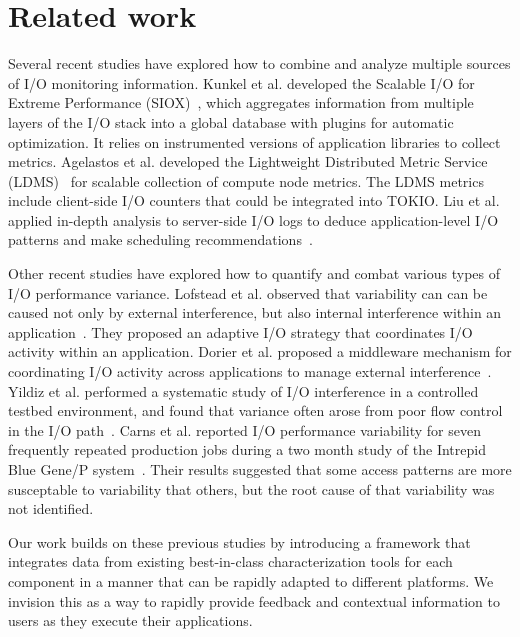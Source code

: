 \section{Related work} \label{sec:related}

Several recent studies have explored how to combine
and analyze multiple sources of I/O monitoring information.
Kunkel et al. developed the Scalable I/O for Extreme Performance
(SIOX)~\cite{Kunkel:2014:SAC:2769884.2769901}, which aggregates
information from multiple layers of the I/O stack into a global database
with plugins for automatic optimization.  It relies on instrumented
versions of application libraries to collect metrics.  Agelastos et al.
developed the Lightweight Distributed Metric Service (LDMS)~\cite{7013000}
for scalable collection of compute node metrics. The LDMS metrics include
client-side I/O counters that could be integrated into TOKIO.  Liu et al. applied in-depth
analysis to server-side I/O logs to deduce application-level I/O patterns
and make scheduling recommendations~\cite{Liu2016}.

Other recent studies have explored how to quantify and combat various
types of I/O performance variance.  Lofstead et al. observed that
variability can can be caused not only by external interference, but also
internal interference within an application~\cite{lofstead2010managing}.
They proposed an adaptive I/O strategy that coordinates I/O activity
within an application.  Dorier et al. proposed a middleware mechanism
for coordinating I/O activity across applications to manage external
interference~\cite{dorier2014calciom}.  Yildiz et al. performed a
systematic study of I/O interference in a controlled testbed environment,
and found that variance often arose from poor flow control in the I/O
path~\cite{Yildiz2016}.  Carns et al. reported I/O performance variability
for seven frequently repeated production jobs during a two month study
of the Intrepid Blue Gene/P system~\cite{carns2011understanding}.
Their results suggested that some access patterns are more susceptable
to variability that others, but the root cause of that variability was
not identified.

Our work builds on these previous studies by introducing a framework that
integrates data from existing best-in-class characterization tools for each
component in a manner that can be rapidly adapted to different platforms.  We
invision this as a way to rapidly provide feedback and contextual information to
users as they execute their applications.

